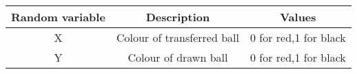 \begin{tabular}{|c|c|c|}             
\hline
Random variable	&       Description	 &          Values\\
\hline 
               X	&Colour of transferred ball	&        0 for red,1 for black\\
\hline           
               Y	&Colour of drawn ball	&        0 for red,1 for black\\
\hline 
\end{tabular}

